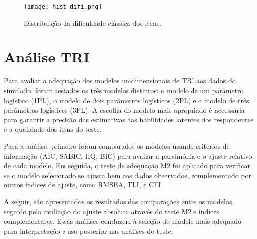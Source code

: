 \begin{figure}[H]
	\centering
	\texttt{[image: hist\_difi.png]}
	\caption{Distribuição da dificuldade clássica dos itens.}
	\label{fig:hist_difi}
\end{figure}


\section{Análise TRI}

Para avaliar a adequação dos modelos unidimensionais de TRI aos dados do simulado, foram testados os três modelos distintos: o modelo de um parâmetro logístico (1PL), o modelo de dois parâmetros logísticos (2PL) e o modelo de três parâmetros logísticos (3PL). A escolha do modelo mais apropriado é necessária para garantir a precisão das estimativas das habilidades latentes dos respondentes e a qualidade dos itens do teste.

Para a análise, primeiro foram comparados os modelos usando critérios de informação (AIC, SABIC, HQ, BIC) para avaliar a parcimônia e o ajuste relativo de cada modelo. Em seguida, o teste de adequação M2 foi aplicado para verificar se o modelo selecionado se ajusta bem aos dados observados, complementado por outros índices de ajuste, como RMSEA, TLI, e CFI.

A seguir, são apresentados os resultados das comparações entre os modelos, seguido pela avaliação do ajuste absoluto através do teste M2 e índices complementares. Essas análises conduzem à seleção do modelo mais adequado para interpretação e uso posterior nas análises do teste.


\begin{table}[!htb]
\end{table}

